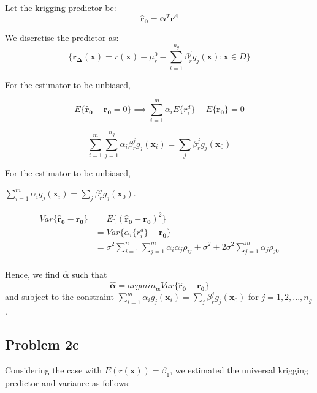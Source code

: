 \documentclass[]{article}
\newcommand{\vect}[1]{\ensuremath{\boldsymbol{\mathbf{#1}}}}
\begin{document}
Let the krigging predictor be: \[
\vect{\hat{r}_0} = \vect{\alpha}^T \vect{r^d} 
\]

We discretise the predictor as: \[
\{\vect{r_{\Delta} (x)} = r(\vect{x}) - \mu_r^0 - \sum_{i=1}^{n_g} \beta_r^j g_j(\vect{x}); \vect{x} \in  D\}
\]

For the estimator to be unbiased,

\[E\{\vect{\hat{r}_0} - \vect{{r}_0} =0 \} \implies \sum_{i=1}^m \alpha_iE\{r_i^d\} - E\{ \vect{{r}_0}\} = 0\]

\[\sum_{i=1}^m \sum_{j=1}^{n_g} \alpha_i \beta_r^j g_j(\vect{x}_i) = \sum_{j}\beta_r^j g_j(\vect{x}_0)\]

For the estimator to be unbiased,

\(\sum_{i=1}^m \alpha_i g_j(\vect{x}_i) = \sum_{j}\beta_r^j g_j(\vect{x}_0)\).

\begin{equation*}
    \begin{split}
      Var\{\vect{\hat{r}_0} - \vect{{r}_0} \} &= E\{(\vect{\hat{r}_0} - \vect{{r}_0})^2 \} \\
                                       &= Var\{\alpha_i \{r_i^d\} - \vect{{r}_0}\} \\
                                        &= \sigma^2 \sum_{i=1}^n\sum_{j=1}^m \alpha_i\alpha_j\rho_{ij} + \sigma^2 + 2 \sigma^2\sum_{j=1}^m\alpha_j\rho_{j0}\\
    \end{split}
\end{equation*}

Hence, we find \(\vect{\hat\alpha}\) such that \[
\vect{\hat\alpha} = argmin_{\vect{\alpha}} Var\{\vect{\hat{r}_0} - \vect{{r}_0} \}
\] and subject to the constraint
\(\sum_{i=1}^m \alpha_i g_j(\vect{x}_i) = \sum_{j}\beta_r^j g_j(\vect{x}_0)\)
for \(j= 1,2,...,n_g\).

\subsection{Problem 2c}\label{problem-2c}

Considering the case with \(E(r(\vect x)) = \beta_1\), we estimated the
universal krigging predictor and variance as follows:
\end{document}
